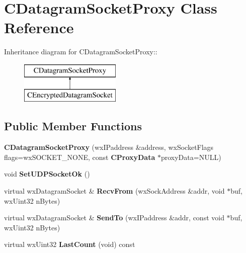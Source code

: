 \section{CDatagramSocketProxy Class Reference}
\label{classCDatagramSocketProxy}
Inheritance diagram for CDatagramSocketProxy::\begin{figure}[H]
\begin{center}
\leavevmode
\includegraphics[height=2cm]{classCDatagramSocketProxy}
\end{center}
\end{figure}
\subsection*{Public Member Functions}
\begin{DoxyCompactItemize}
\item 
{\bfseries CDatagramSocketProxy} (wxIPaddress \&address, wxSocketFlags flags=wxSOCKET\_\-NONE, const {\bf CProxyData} $\ast$proxyData=NULL)\label{classCDatagramSocketProxy_a3fccac8e839eb63ceccc07ec40a5b9fe}

\item 
void {\bfseries SetUDPSocketOk} ()\label{classCDatagramSocketProxy_a84e09a7777c9bce96baad3d19ef09265}

\item 
virtual wxDatagramSocket \& {\bfseries RecvFrom} (wxSockAddress \&addr, void $\ast$buf, wxUint32 nBytes)\label{classCDatagramSocketProxy_aec93fa83e9c6f6990cc513415ae75c5e}

\item 
virtual wxDatagramSocket \& {\bfseries SendTo} (wxIPaddress \&addr, const void $\ast$buf, wxUint32 nBytes)\label{classCDatagramSocketProxy_a0f8cbd54500ba553c8b6a44c3877283c}

\item 
virtual wxUint32 {\bfseries LastCount} (void) const \label{classCDatagramSocketProxy_aa537e36245bbff6d75f79e971849bf31}

\end{DoxyCompactItemize}
